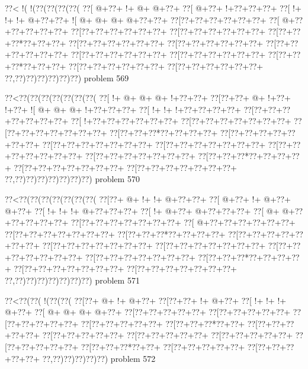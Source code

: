 \vbox{\vbox{\goo
\0??<\- !(\- !(\0??(\0??(\0??(\0??(
\0??[\- @+\0??+\- !+\- @+\- @+\0??+
\0??[\- @+\0??+\- !+\0??+\0??+\0??+
\0??[\- !+\- !+\- !+\- @+\0??+\0??+
\- ![\- @+\- @+\- @+\- @+\0??+\0??+
\0??[\0??+\0??+\0??+\0??+\0??+\0??+
\0??[\- @+\0??+\0??+\0??+\0??+\0??+
\0??[\0??+\0??+\0??+\0??+\0??+\0??+
\0??[\0??+\0??+\0??+\0??+\0??+\0??+
\0??[\0??+\0??+\0??*\0??+\0??+\0??+
\0??[\0??+\0??+\0??+\0??+\0??+\0??+
\0??[\0??+\0??+\0??+\0??+\0??+\0??+
\0??[\0??+\0??+\0??+\0??+\0??+\0??+
\0??[\0??+\0??+\0??+\0??+\0??+\0??+
\0??[\0??+\0??+\0??+\0??+\0??+\0??+
\0??[\0??+\0??+\0??*\0??+\0??+\0??+
\0??[\0??+\0??+\0??+\0??+\0??+\0??+
\0??[\0??+\0??+\0??+\0??+\0??+\0??+
\0??,\0??)\0??)\0??)\0??)\0??)\0??)
}
\hfil problem 569\hfil\break
}

\vbox{\vbox{\goo
\0??<\0??(\0??(\0??(\0??(\0??(\0??(\0??(
\0??[\- !+\- @+\- @+\- @+\- !+\0??+\0??+
\0??[\0??+\0??+\- @+\- !+\0??+\- !+\0??+
\- ![\- @+\- @+\- @+\- !+\0??+\0??+\0??+
\0??[\- !+\- !+\- !+\0??+\0??+\0??+\0??+
\0??[\0??+\0??+\0??+\0??+\0??+\0??+\0??+
\0??[\- !+\0??+\0??+\0??+\0??+\0??+\0??+
\0??[\0??+\0??+\0??+\0??+\0??+\0??+\0??+
\0??[\0??+\0??+\0??+\0??+\0??+\0??+\0??+
\0??[\0??+\0??+\0??*\0??+\0??+\0??+\0??+
\0??[\0??+\0??+\0??+\0??+\0??+\0??+\0??+
\0??[\0??+\0??+\0??+\0??+\0??+\0??+\0??+
\0??[\0??+\0??+\0??+\0??+\0??+\0??+\0??+
\0??[\0??+\0??+\0??+\0??+\0??+\0??+\0??+
\0??[\0??+\0??+\0??+\0??+\0??+\0??+\0??+
\0??[\0??+\0??+\0??*\0??+\0??+\0??+\0??+
\0??[\0??+\0??+\0??+\0??+\0??+\0??+\0??+
\0??[\0??+\0??+\0??+\0??+\0??+\0??+\0??+
\0??,\0??)\0??)\0??)\0??)\0??)\0??)\0??)
}
\hfil problem 570\hfil\break
}

\vbox{\vbox{\goo
\0??<\0??(\0??(\0??(\0??(\0??(\0??(\0??(
\0??[\0??+\- @+\- !+\- !+\- @+\0??+\0??+
\0??[\- @+\0??+\- !+\- @+\0??+\- @+\0??+
\0??[\- !+\- !+\- !+\- @+\0??+\0??+\0??+
\0??[\- !+\- @+\0??+\- @+\0??+\0??+\0??+
\0??[\- @+\- @+\0??+\0??+\0??+\0??+\0??+
\0??[\0??+\0??+\0??+\0??+\0??+\0??+\0??+
\0??[\- @+\0??+\0??+\0??+\0??+\0??+\0??+
\0??[\0??+\0??+\0??+\0??+\0??+\0??+\0??+
\0??[\0??+\0??+\0??*\0??+\0??+\0??+\0??+
\0??[\0??+\0??+\0??+\0??+\0??+\0??+\0??+
\0??[\0??+\0??+\0??+\0??+\0??+\0??+\0??+
\0??[\0??+\0??+\0??+\0??+\0??+\0??+\0??+
\0??[\0??+\0??+\0??+\0??+\0??+\0??+\0??+
\0??[\0??+\0??+\0??+\0??+\0??+\0??+\0??+
\0??[\0??+\0??+\0??*\0??+\0??+\0??+\0??+
\0??[\0??+\0??+\0??+\0??+\0??+\0??+\0??+
\0??[\0??+\0??+\0??+\0??+\0??+\0??+\0??+
\0??,\0??)\0??)\0??)\0??)\0??)\0??)\0??)
}
\hfil problem 571\hfil\break
}

\vbox{\vbox{\goo
\0??<\0??(\0??(\- !(\0??(\0??(
\0??[\0??+\- @+\- !+\- @+\0??+
\0??[\0??+\0??+\- !+\- @+\0??+
\0??[\- !+\- !+\- !+\- @+\0??+
\0??[\- @+\- @+\- @+\- @+\0??+
\0??[\0??+\0??+\0??+\0??+\0??+
\0??[\0??+\0??+\0??+\0??+\0??+
\0??[\0??+\0??+\0??+\0??+\0??+
\0??[\0??+\0??+\0??+\0??+\0??+
\0??[\0??+\0??+\0??*\0??+\0??+
\0??[\0??+\0??+\0??+\0??+\0??+
\0??[\0??+\0??+\0??+\0??+\0??+
\0??[\0??+\0??+\0??+\0??+\0??+
\0??[\0??+\0??+\0??+\0??+\0??+
\0??[\0??+\0??+\0??+\0??+\0??+
\0??[\0??+\0??+\0??*\0??+\0??+
\0??[\0??+\0??+\0??+\0??+\0??+
\0??[\0??+\0??+\0??+\0??+\0??+
\0??,\0??)\0??)\0??)\0??)\0??)
}
\hfil problem 572\hfil\break
}


